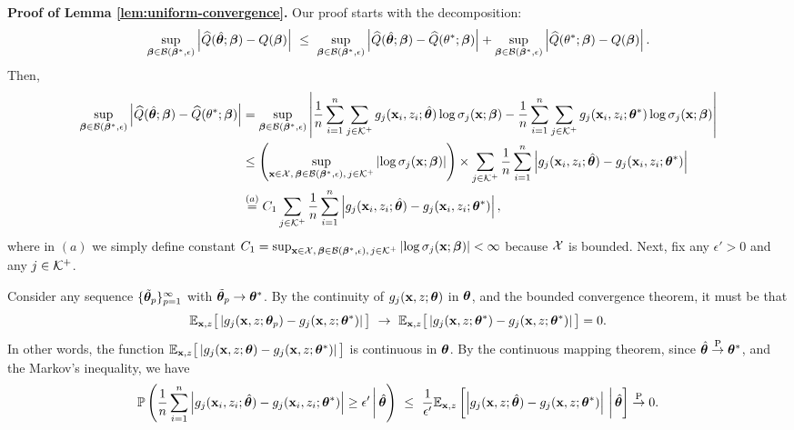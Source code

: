 \noindent
\textbf{Proof of Lemma \ref{lem:uniform-convergence}.}
Our proof starts with the decomposition: 
\begin{align}
\label{eqn:decomposition}
     \sup_{\bm{\beta} \in \mathcal{B}(\bm{\beta}^*, \epsilon)}
    \left|
    \widehat{Q}(\hat{\bm{\theta}};\bm{\beta}) - {Q}(\bm{\beta})
    \right| ~\leq~  \sup_{\bm{\beta} \in \mathcal{B}(\bm{\beta}^*, \epsilon)}
    \left|
    \widehat{Q}(\hat{\bm{\theta}};\bm{\beta}) -  \widehat{Q}({\theta}^*;\bm{\beta})
    \right| + \sup_{\bm{\beta} \in \mathcal{B}(\bm{\beta}^*, \epsilon)}
    \left|
    \widehat{Q}({\theta}^*;\bm{\beta}) - {Q}(\bm{\beta})
    \right|.
\end{align}
Then, 
\begin{align*}
     \sup_{\bm{\beta} \in \mathcal{B}(\bm{\beta}^*, \epsilon)}
    \left|
    \widehat{Q}(\hat{\bm{\theta}};\bm{\beta}) -  \widehat{Q}({\theta}^*;\bm{\beta})
    \right| &= \sup_{\bm{\beta} \in \mathcal{B}(\bm{\beta}^*, \epsilon)}\left|
    \frac{1}{n}\sum_{i=1}^n\sum_{j\in \mathcal{K}^+}g_j(\mathbf{x}_i, z_i; \hat{\bm{\theta}})\log \sigma_j(\mathbf{x}; \bm{\beta})
    - \frac{1}{n}\sum_{i=1}^n\sum_{j\in \mathcal{K}^+}g_j(\mathbf{x}_i, z_i; {\bm{\theta}}^*)\log \sigma_j(\mathbf{x}; \bm{\beta})
    \right|\\
    &\leq 
    \left(\sup_{\mathbf{x} \in \mathcal{X},\, \bm{\beta} \in \mathcal{B}(\bm{\beta}^*, \epsilon),\, j\in \mathcal{K}^+}
    \left|
    \log\sigma_j(\mathbf{x}; \bm{\beta})
    \right|\right)\times
    \sum_{j\in \mathcal{K}^+}\frac{1}{n}\sum_{i=1}^n\left|
    g_j(\mathbf{x}_i, z_i; \hat{\bm{\theta}}) - g_j(\mathbf{x}_i, z_i; {\bm{\theta}}^*)
    \right|\\
    &\stackrel{(a)}{=} 
    C_1
    \sum_{j\in \mathcal{K}^+}\frac{1}{n}\sum_{i=1}^n\left|
    g_j(\mathbf{x}_i, z_i; \hat{\bm{\theta}}) - g_j(\mathbf{x}_i, z_i; {\bm{\theta}}^*)
    \right|,
\end{align*}
where in $(a)$ we simply define constant $C_1 = \sup_{\mathbf{x} \in \mathcal{X},\, \bm{\beta} \in \mathcal{B}(\bm{\beta}^*, \epsilon),\, j\in \mathcal{K}^+}
\left|\log\sigma_j(\mathbf{x}; \bm{\beta})\right| < \infty$ because $\mathcal{X}$ is bounded. 
Next, fix any $\epsilon' > 0$ and any $j \in \mathcal{K}^+$. 

Consider any sequence $\{ \tilde{\bm{\theta}}_p\}_{p=1}^{\infty}$ with $\tilde{\bm{\theta}}_p\rightarrow \bm{\theta}^*$. By the continuity of $g_j(\mathbf{x}, z; {\bm{\theta}})$ in ${\bm{\theta}}$, and the bounded convergence theorem, it must be that 
$$
\mathbb{E}_{\mathbf{x}, z}
\big[
\left|
g_j(\mathbf{x}, z; {\bm{\theta}}_p) - g_j(\mathbf{x}, z; {\bm{\theta}}^*)
\right|
\big]~\rightarrow~ 
\mathbb{E}_{\mathbf{x}, z}
\big[
\left|
g_j(\mathbf{x}, z; {\bm{\theta}}^*) - g_j(\mathbf{x}, z; {\bm{\theta}}^*)
\right|
\big] = 0. 
$$
In other words, the function $\mathbb{E}_{\mathbf{x}, z}
\big[
\left|
g_j(\mathbf{x}, z; {\bm{\theta}}) - g_j(\mathbf{x}, z; {\bm{\theta}}^*)
\right|
\big]$ is continuous in $\bm{\theta}$. 
By the continuous mapping theorem, since $\hat{\bm{\theta}} \overset{\text{\upshape{P}}}{\rightarrow} \bm{\theta}^*$, and the  Markov's inequality, we have 
$$
\mathbb{P}\left(
\frac{1}{n}\sum_{i=1}^n\left|
    g_j(\mathbf{x}_i, z_i; \hat{\bm{\theta}}) - g_j(\mathbf{x}_i, z_i; {\bm{\theta}}^*)
    \right| \geq \epsilon' \,\bigg|\, \hat{\bm{\theta}}
\right)
~\leq~ 
\frac{1}{\epsilon'}
\mathbb{E}_{\mathbf{x}, z}
\left[
\left|
g_j(\mathbf{x}, z; \hat{\bm{\theta}}) - g_j(\mathbf{x}, z; {\bm{\theta}}^*)
\right|\,\bigg|\, \hat{\bm{\theta}}
\right] \overset{\text{\upshape{P}}}{\rightarrow} 0.
$$

